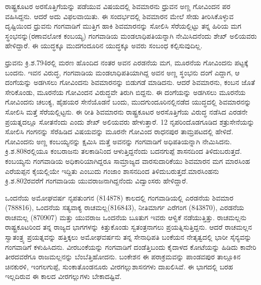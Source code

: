 ರಾಷ್ಟ್ರಕೂಟರ ಅರಸೊತ್ತಿಗೆಯನ್ನು ಪಡೆಯುವ ವಿಷಯದಲ್ಲಿ ಶಿವಮಾರನು ಧ್ರುವನ ಅಣ್ಣ ಗೋವಿಂದನ ಪರ ವಹಿಸಿದ್ದನು. ಆದರೆ ಅದು ವಿಫಲವಾಯಿತು. ಈ ಸಂದರ್ಭದಲ್ಲಿ ಶಿವಮಾರನ ಮೇಲೆ ಸೇಡು ತೀರಿಸಿಕೊಳ್ಳುವ ದೃಷ್ಟಿಯಿಂದ ಧ್ರುವನು ಗಂಗವಾಡಿಗೆ ಮುತ್ತಿಗ ಹಾಕಿ ಶಿವಮಾರನನ್ನು ಸೋಲಿಸಿ ಸೆರೆಯಲ್ಲಿಟ್ಟು ತನ್ನ ಹಿರಿಯ ಮಗ ಸ್ಥಂಭನನ್ನು(ರಣಾವಲೋಕ ಕಂಬಯ್ಯ) ಗಂಗವಾಡಿಯ ಮಂಡಲಾಧಿಪತಿಯನ್ನಾಗಿ ನೇಮಿಸಿದನೆಂದು ಶೇಖ್​ ಅಲಿಯವರು ಹೇಳಿದ್ದಾರೆ. ಈ ಯುದ್ಧಕ್ಕೂ ಮುದಗಂದೂರಿನ ಯುದ್ಧಕ್ಕೂ ಅವರು ಸಂಬಂಧ ಕಲ್ಪಿಸುವುದಿಲ್ಲ.

ಧ್ರುವನು ಕ್ರಿ.ಶ.794ರಲ್ಲಿ ಮರಣ ಹೊಂದಿದ ನಂತರ ಅವನ ಎರಡನೆಯ ಮಗ, ಮೂರನೆಯ ಗೋವಿಂದನು ಪಟ್ಟಕ್ಕೆ ಬಂದನು. ಇವನ ವಿರುದ್ಧ, ಗಂಗವಾಡಿಯ ಮಂಡಲಾಧಿಪತಿಯಾಗಿದ್ದ ಅವನ ಅಣ್ಣ ಸ್ಥಂಭನು ದಂಗೆ ಎದ್ದಾಗ, ಆ ದಂಗೆಯನ್ನು ಅಡಗಿಸಲು ಗೋವಿಂದನು ಶಿವಮಾರನನ್ನು ಬಿಡುಗಡೆ ಮಾಡಿದನು. ಆದರೆ ಶಿವಮಾರನು, ಕಂಬನ ಜೊತೆ ಸೇರಿಕೊಂಡು, ಮೂರನೆಯ ಗೋವಿಂದನ ವಿರುದ್ಧವೇ ತಿರುಗಿ ಬಿದ್ದನು. ಈ ದಂಗೆಯನ್ನು ಅಡಗಿಸಲು ಮೂರನೆಯ ಗೋವಿಂದನು ಚಲುಕ್ಯ, ಹೈಹಯರ ಸೇನೆಯೊಡನೆ ಬಂದು, ಮುದಗುಂದೂರಿನಲ್ಲಿನಡೆದ ಯುದ್ಧದಲ್ಲಿ ಶಿವಮಾರನನ್ನು ಸೋಲಿಸಿ ಮತ್ತೆ ಸೆರೆಯಲ್ಲಿಟ್ಟನು. ಈ ರೀತಿ ಶಿವಮಾರನು ರಾಷ್ಟ್ರಕೂಟರ ಅರಸೊತ್ತಿಗೆಯ ವಿರುದ್ಧ ನಡೆಸಿದ ಎರಡನೇ ಪ್ರಯತ್ನದಲ್ಲೂ ಸೋತನೆಂದು ಎಂದು ಶೇಖ್​ ಅಲಿಯವರು ಹೇಳುತ್ತಾರೆ. 12 ನೃಪರಿಂದೊಡಗೂಡಿದ ಶತ್ರುಸೇನೆಯನ್ನು ಸೋಲಿಸಿ ಗಂಗನನ್ನು ಸೆರೆಹಿಡಿದ ವಿಷಯವನ್ನು ಮೂರನೇ ಗೋವಿಂದ ರಾಧನಪುರ ತಾಮ್ರಪಟದಲ್ಲಿ ಹೇಳಿದೆ. ಗೋವಿಂದನು ಅಣ್ಣ ಕಂಬಯ್ಯನನ್ನು ಕ್ಷಮಿಸಿ ಮತ್ತೆ ಅವನನ್ನು ಗಂಗವಾಡಿಗೆ ಅಧಿಪತಿಯನ್ನಾಗಿ ನೇಮಿಸಿದನು. ಕ್ರಿ.ಶ.808ರಲ್ಲಿಯೂ ಕಂಬರಾಜನು ತಲಕಾಡಿನಿಂದ ಆಳುತ್ತಿದ್ದನೆಂದು ಬದನಗುಪ್ಪೆ ಶಾಸನದಿಂದ ತಿಳಿದುಬರುತ್ತದೆ. ಕಂಬಯ್ಯನು ಗಂಗವಾಡಿಯ ಅಧಿಕಾರಿಯಾಗಿದ್ದರೂ ಸಾಮ್ರಾಜ್ಯದ ವಾರಸುದಾರಿಕೆಯು ಶಿವಮಾರನ ಮಗ ಮಾರಸಿಂಹ ಎರೆಯಪ್ಪನ ಕೈಯಲ್ಲಿಯೇ ಇದ್ದಿತು ಎಂಬುದು ಗಂಜಾಂ ಶಾಸನದಿಂದ ತಿಳಿದುಬರುತ್ತದೆ.ಮಾರಸಿಂಹನು ಕ್ರಿ.ಶ.802ರವರೆಗೆ ಗಂಗವಾಡಿಯ ಯುವರಾಜನಾಗಿದ್ದನೆಂದು ವಿದ್ವಾಂಸರು ಹೇಳಿದ್ದಾರೆ.

ಒಂದನೆಯ ಅಮೋಘವರ್ಷ ನೃಪತುಂಗನ (814878) ಕಾಲದಲ್ಲಿ ಗಂಗವಾಡಿಯಲ್ಲಿ ಎರಡನೆಯ ಶಿವಮಾರ (788816), ಒಂದನೆಯ ಸತ್ಯವಾಕ್ಯ ರಾಚಮಲ್ಲ(816843), ನೀತಿಮಾರ್ಗ ಎರೆಗಂಗ (843870), ಎರಡನೆಯ ರಾಚಮಲ್ಲ (870907) ಮತ್ತು ಯುವರಾಜ ಒಂದನೆಯ ಬೂತುಗ ಇವರು ಆಳ್ವಿಕೆ ನಡೆಯುತ್ತಿತ್ತು. ರಾಚಮಲ್ಲನು ರಾಷ್ಟ್ರಕೂಟರಿಂದ ತನ್ನ ರಾಜ್ಯದ ಭಾಗಗಳನ್ನು ಕಿತ್ತುಕೊಂಡು ಸ್ವತಂತ್ರನಾಗಲು ಪ್ರಯತ್ನಿಸುತ್ತಿದ್ದನು. ಆದರೆ ರಾಚಮಲ್ಲನ ಸ್ವಾತಂತ್ರ್ಯ ಪ್ರಯತ್ನವನ್ನು ಹತ್ತಿಕ್ಕಲು ಅಮೋಘವರ್ಷನು ತನ್ನ ಸೇನಾಧಿಪತಿ ಬಂಕೆಯನ ನೇತೃತ್ವದಲ್ಲಿ ಭಾರೀ ಸೈನ್ಯವನ್ನು ಗಂಗವಾಡಿಗೆ ಕಳುಹಿಸಿದನು. ವೀರಬಂಕೆಯನ್ನು ಗಂಗವಾಡಿಗೆ ದಂಡೆತ್ತಿಬಂದು ಕೈದಾಳದ ಕೋಟೆಯನ್ನು ಹಿಡಿದು ಕಾವೇರಿ ತೀರದವರೆಗೂ ರಾಜಮಲ್ಲನನ್ನು ಬೆಂಬೆತ್ತಿಹೋದನು. ಬಂಕೇಶನ ಈ ಪರಾಕ್ರಮವನ್ನು ಪಾಂಡವಪುರ ತಾಲ್ಲೂಕಿನ ಚಿನಕುರಳಿ, ಇಂಗಲಗುಪ್ಪೆ, ಸುಂಕಾತೊಂಡನೂರು ವೀರಗಲ್ಲುಶಾಸನಗಳು ದಾಖಲಿಸಿವೆ. ಈ ಭಾಗದಲ್ಲಿ ಬರಹ ಇಲ್ಲದಿರುವ ಈ ಕಾಲದ ವೀರಗಲ್ಲುಗಳು ಬೇಕಾದಷ್ಟಿವೆ.

